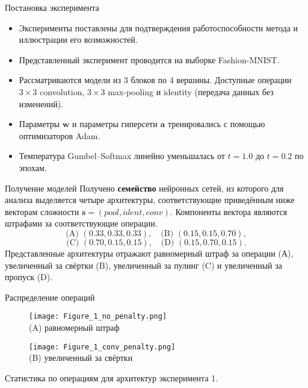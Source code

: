 \documentclass{beamer}
\begin{document}

\begin{frame}{Постановка эксперимента}
\begin{itemize}
    \item Эксперименты поставлены для подтверждения работоспособности метода и иллюстрации его возможностей.
    \vspace{10pt}
    \item Представленный эксперимент проводится на выборке Fashion-MNIST.
    \vspace{10pt}
    \item Рассматриваются модели из 3 блоков по 4 вершины. Доступные операции \(3{\times}3\) convolution, \(3{\times}3\) max-pooling и identity (передача данных без изменений).
    \vspace{10pt}
    \item Параметры $\boldsymbol w$ и параметры гиперсети $\boldsymbol a$ тренировались с помощью оптимизаторов Adam. 
    \vspace{10pt}
    \item Температура Gumbel–Softmax линейно уменьшалась от \(t{=}1.0\) до \(t{=}0.2\) по эпохам. 

\end{itemize}
\end{frame}

\begin{frame}{Получение моделей}
Получено \textbf{семейство} нейронных сетей, из которого для анализа выделяется четыре архитектуры, соответствующие приведённым ниже векторам сложности $\boldsymbol{s} = (pool, ident, conv)$. Компоненты вектора являются штрафами за соответствующие операции.
\[
\text{(A) } (0.33,0.33,0.33),\quad
\text{(B) } (0.15,0.15,0.70),
\]
\[
\text{(C) } (0.70,0.15,0.15),\quad
\text{(D) } (0.15,0.70,0.15).
\]
Представленные архитектуры отражают равномерный штраф за операции (А), увеличенный за свёртки (B), увеличенный за пулинг (C) и увеличенный за пропуск (D). 


\end{frame}

\begin{frame}{Распределение операций}

\begin{figure}[!ht]
    \centering
    \begin{minipage}[t]{0.48\linewidth}
        \centering
        \texttt{[image: Figure\_1\_no\_penalty.png]}\\
        (A) равномерный штраф
    \end{minipage}\hfill
    \begin{minipage}[t]{0.48\linewidth}
        \centering
        \texttt{[image: Figure\_1\_conv\_penalty.png]}\\
        (B) увеличенный за свёртки
    \end{minipage}

             
    \label{fig2}
\end{figure}
    Статистика по операциям для архитектур эксперимента 1.
\end{frame}
\end{document}
